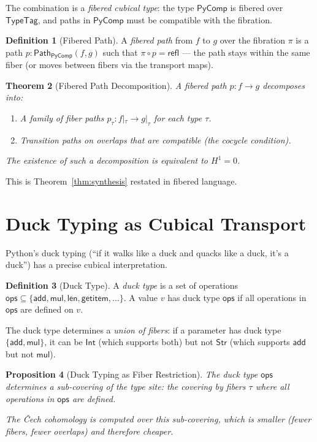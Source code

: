 \documentclass[11pt,a4paper]{report}
\theoremstyle{definition}
\newtheorem{definition}{Definition}[chapter]
\theoremstyle{plain}
\newtheorem{theorem}[definition]{Theorem}
\newtheorem{proposition}[definition]{Proposition}
\newcommand{\Path}{\mathsf{Path}}
\newcommand{\Hone}{H^1}
\begin{document}
The combination is a \emph{fibered cubical type}: the type
$\mathsf{PyComp}$ is fibered over $\mathsf{TypeTag}$, and paths
in $\mathsf{PyComp}$ must be compatible with the fibration.

\begin{definition}[Fibered Path]
A \emph{fibered path} from $f$ to $g$ over the fibration $\pi$ is a
path $p : \Path_{\mathsf{PyComp}}(f, g)$ such that
$\pi \circ p = \mathsf{refl}$ --- the path stays within the same
fiber (or moves between fibers via the transport maps).
\end{definition}

\begin{theorem}[Fibered Path Decomposition]
A fibered path $p : f \to g$ decomposes into:
\begin{enumerate}
  \item A family of \emph{fiber paths} $p_\tau : f|_\tau \to g|_\tau$
    for each type $\tau$.
  \item \emph{Transition paths} on overlaps that are compatible
    (the cocycle condition).
\end{enumerate}
The existence of such a decomposition is equivalent to $\Hone = 0$.
\end{theorem}

This is Theorem~\ref{thm:synthesis} restated in fibered language.

\section{Duck Typing as Cubical Transport}

Python's duck typing (``if it walks like a duck and quacks like a
duck, it's a duck'') has a precise cubical interpretation.

\begin{definition}[Duck Type]
A \emph{duck type} is a set of operations $\mathsf{ops} \subseteq
\{\mathsf{add}, \mathsf{mul}, \mathsf{len}, \mathsf{getitem},
\ldots\}$.  A value $v$ has duck type $\mathsf{ops}$ if all operations
in $\mathsf{ops}$ are defined on $v$.
\end{definition}

The duck type determines a \emph{union of fibers}: if a parameter has
duck type $\{\mathsf{add}, \mathsf{mul}\}$, it can be $\mathsf{Int}$
(which supports both) but not $\mathsf{Str}$ (which supports
$\mathsf{add}$ but not $\mathsf{mul}$).

\begin{proposition}[Duck Typing as Fiber Restriction]
The duck type $\mathsf{ops}$ determines a sub-covering of the type
site: the covering by fibers $\tau$ where all operations in
$\mathsf{ops}$ are defined.

The \v{C}ech cohomology is computed over this sub-covering, which is
smaller (fewer fibers, fewer overlaps) and therefore cheaper.
\end{proposition}
\end{document}
